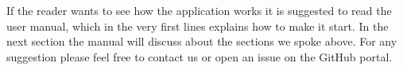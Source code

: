 If the reader wants to see how the application works it is suggested to read the user manual, which in the very first lines explains how to make it start.
In the next section the manual will discuss about the sections we spoke above. For any suggestion please feel free to contact us or open an issue on the GitHub portal. 


\begin{comment}
\begin{labeling}{alligator}
	\item Frontend
	\begin{itemize}
		\item View
		\item ViewModel
		\item Model
	\end{itemize}
\item Backend
\begin{itemize}
	\item \textcolor{red}{PER STEFANO}
	\item \textcolor{red}{PER STEFANO}
	\item \textcolor{red}{PER STEFANO}
\end{itemize}
\end{labeling}




More precisely:
\begin{labeling}{alligator}
\item A student will be able to:
\begin{itemize}
\item Accept or refuse a mark;%
\item Visualize its booklet containing the marks;
\item Subscribe to an exam.
\end{itemize}
\item A professor will be able to:
\begin{itemize}
\item Visualize the exams to which it has been assigned;
\item See the students registered to his/her exams.
\end{itemize}
\item The university and the administrator will be able to add, eliminate and modify:
\begin{itemize}
\item Academic years;
\item Degree courses;
\item Didactic activities;
\item Exams;
\item Users.
\end{itemize}
\end{labeling}

To use \project{} you need to install \emph{\href{https://metamask.io/}{MetaMask}}\subscript{G} to directly execute the \DH app on your browser.

All the other users have to be logged through Metamask.
\end{comment}